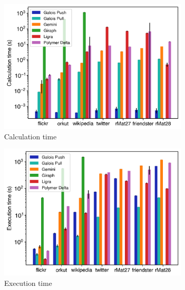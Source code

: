 \begin{figure}[ht]
	\hfil
	\begin{subfigure}{0.32\textwidth}
		\includegraphics[width=\linewidth]{../../plots/singleNodePR_calcTime.png}
		\caption{Calculation time}
		\label{fig:singleNodePR_calc}
	\end{subfigure}
	\hfil
	\begin{subfigure}{0.32\textwidth}
		\includegraphics[width=\linewidth]{../../plots/singleNodePR_execTime.png}
		\caption{Execution time}
		\label{fig:singleNodePR_exec}
	\end{subfigure}
	\hfil
	\begin{subfigure}{0.32\textwidth}

\end{subfigure}
\end{figure}
